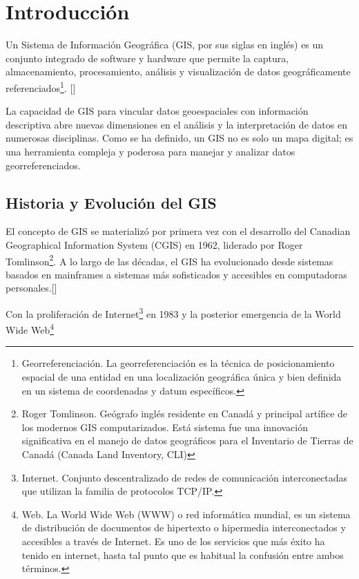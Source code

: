 \chapter{Introducción}\label{chapter:introduction}


Un Sistema de Información Geográfica (GIS, por sus siglas en inglés) es
un conjunto integrado de software y hardware que permite la captura,
almacenamiento, procesamiento, análisis y visualización de datos
geográficamente referenciados\footnote{Georreferenciación. La
  georreferenciación es la técnica de posicionamiento espacial de una
  entidad en una localización geográfica única y bien definida en un
  sistema de coordenadas y datum específicos.}.  [\cite{uwmi-libraries-gis}]


La capacidad de GIS para vincular datos geoespaciales con información descriptiva abre
nuevas dimensiones en el análisis y la interpretación de datos en
numerosas disciplinas. Como se ha definido, un GIS no es solo un mapa
digital; es una herramienta compleja y poderosa para manejar y analizar
datos georreferenciados.


\section{Historia y Evolución del GIS}\label{historia-y-evolucion-del-gis}

El concepto de GIS se materializó por primera vez con el desarrollo del
Canadian Geographical Information System (CGIS) en 1962, liderado por
Roger Tomlinson\footnote{Roger Tomlinson. Geógrafo inglés residente en
  Canadá y principal artífice de los modernos GIS computarizados. Está
sistema fue una innovación significativa en el manejo de datos
geográficos para el Inventario de Tierras de Canadá (Canada Land
Inventory, CLI)}.
A lo largo de las décadas, el GIS ha evolucionado desde sistemas 
basados en mainframes a sistemas más sofisticados y accesibles en computadoras personales.[\cite{grindgis-gis}] 


Con la proliferación de Internet\footnote{Internet. Conjunto
  descentralizado de redes de comunicación interconectadas que utilizan
  la familia de protocolos TCP/IP.} en 1983 \parencite{andrews-who-invented-the-internet} y la posterior
emergencia de la World Wide Web\footnote{Web. La World Wide Web (WWW) o red informática mundial, es un sistema de distribución de documentos
  de hipertexto o hipermedia interconectados y accesibles a través de
  Internet. Es uno de los servicios que más éxito ha tenido en internet,
  hasta tal punto que es habitual la confusión entre ambos términos.} 
  
